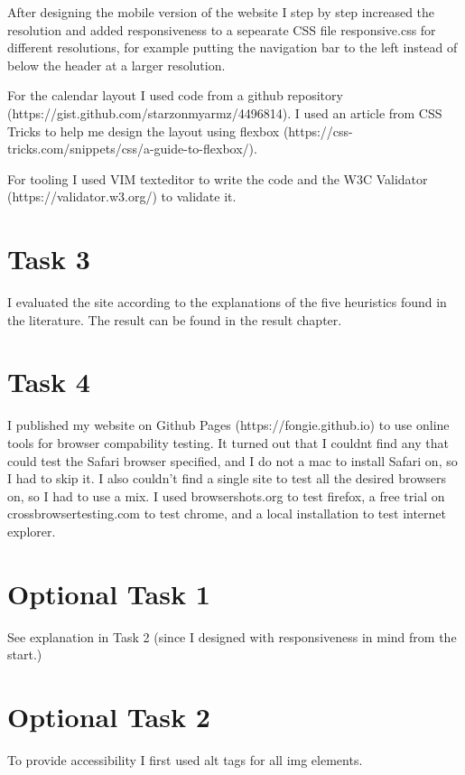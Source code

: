 \documentclass[a4paper]{scrreprt}
\begin{document}
After designing the mobile version of the website I step by step increased the resolution and added responsiveness to a sepearate CSS file responsive.css for different resolutions, for example putting the navigation bar to the left instead of below the header at a larger resolution.

For the calendar layout I used code from a github repository\\ (https://gist.github.com/starzonmyarmz/4496814). I used an article from CSS Tricks to help me design the layout using flexbox (https://css-tricks.com/snippets/css/a-guide-to-flexbox/).

For tooling I used VIM texteditor to write the code and the W3C Validator (https://validator.w3.org/) to validate it.

\section{Task 3}

I evaluated the site according to the explanations of the five heuristics found in the literature. The result can be found in the result chapter.

\section{Task 4}

I published my website on Github Pages (https://fongie.github.io) to use online tools for browser compability testing. It turned out that I couldnt find any that could test the Safari browser specified, and I do not a mac to install Safari on, so I had to skip it. I also couldn't find a single site to test all the desired browsers on, so I had to use a mix. I used browsershots.org to test firefox, a free trial on crossbrowsertesting.com to test chrome, and a local installation to test internet explorer.

\section{Optional Task 1}

See explanation in Task 2 (since I designed with responsiveness in mind from the start.)

\section{Optional Task 2}

To provide accessibility I first used alt tags for all img elements. 
\end{document}
